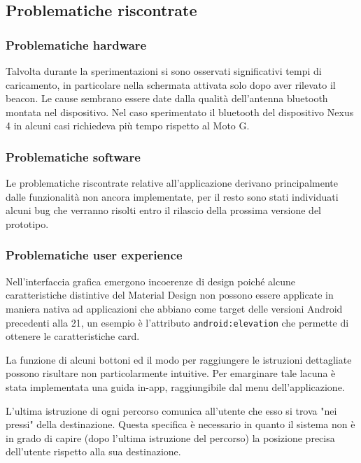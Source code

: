 \documentclass[../Sperimentazione.tex]{subfiles}
\begin{document}
			
		\newpage
			
	
		\newpage
		\subsection{Problematiche riscontrate}
		
			\subsubsection{Problematiche hardware}
				Talvolta durante la sperimentazioni si sono osservati significativi tempi di caricamento, in particolare nella schermata attivata solo dopo aver rilevato il beacon. Le cause sembrano essere date dalla qualità dell'antenna bluetooth montata nel dispositivo. Nel caso sperimentato il bluetooth del dispositivo Nexus 4 in alcuni casi richiedeva più tempo rispetto al Moto G.
		
			\subsubsection{Problematiche software}
				Le problematiche riscontrate relative all'applicazione derivano principalmente dalle funzionalità non ancora implementate, per il resto sono stati individuati alcuni bug che verranno risolti entro il rilascio della prossima versione del prototipo.
		
			\subsubsection{Problematiche user experience}
				Nell'interfaccia grafica emergono incoerenze di design poiché alcune caratteristiche distintive del Material Design non possono essere applicate in maniera nativa ad applicazioni che abbiano come target delle versioni Android precedenti alla 21, un esempio è l'attributo \verb|android:elevation| che permette di ottenere le caratteristiche card\g.

La funzione di alcuni bottoni ed il modo per raggiungere le istruzioni dettagliate possono risultare non particolarmente intuitive. Per emarginare tale lacuna è stata implementata una guida in-app, raggiungibile dal menu dell'applicazione.
	
		L'ultima istruzione di ogni percorso comunica all'utente che esso si trova "nei pressi" della destinazione. Questa specifica è necessario in quanto il sistema non è in grado di capire (dopo l'ultima istruzione del percorso) la posizione precisa dell'utente rispetto alla sua destinazione. 
			
\end{document}
